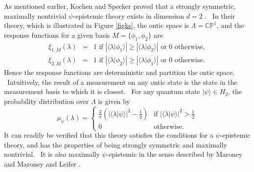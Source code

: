 \documentclass[letterpaper,12pt]{article}
\begin{document}
As mentioned earlier, Kochen and Specker proved that a strongly symmetric,
maximally nontrivial $\psi $-epistemic theory exists in dimension $d=2$ \cite%
{ks}. \ In their theory, which is illustrated in Figure \ref{figks}, the ontic space is $\Lambda =\mathbb{CP}^{1}$, and the
response functions for a given basis $M=\{\phi _{1},\phi _{2}\}$ are
\begin{eqnarray}
\xi _{1,M}(\lambda ) &=&1\text{ if }\left\vert  \langle \lambda |
\phi_1 \rangle \right\vert \geq \left\vert  \langle \lambda |
\phi_2 \rangle \right\vert \text{ or }0\text{ otherwise}, \\
\xi _{2,M}(\lambda ) &=&1\text{ if }\left\vert  \langle \lambda |
\phi_2 \rangle \right\vert \geq \left\vert  \langle \lambda |
\phi_1 \rangle \right\vert \text{ or }0\text{ otherwise}.
\end{eqnarray}%
Hence the response functions are deterministic and partition the ontic
space. \ Intuitively, the result of a measurement on any ontic state is
the state in the measurement basis to which it is closest. \ For any quantum
state $ | \psi \rangle \in H_{2}$, the probability distribution
over $\Lambda $ is given by
\begin{equation*}
\mu _{\psi }(\lambda )=%
\begin{cases}
\frac{2}{\pi }\left( | \langle \lambda | \psi \rangle |^{2}-\frac{1%
}{2}\right)  & \text{if }| \langle \lambda | \psi \rangle |^{2}>%
\frac{1}{2} \\
0 & \text{otherwise}.%
\end{cases}%
\end{equation*}%
It can readily be verified that this theory satisfies the conditions for a $\psi$-epistemic theory, and has the properties of being
strongly symmetric and maximally nontrivial. \ It is also maximally $\psi$-epistemic in the sense described by Maroney \cite{mar} and Maroney and Leifer \cite{marleif}. \
\end{document}
